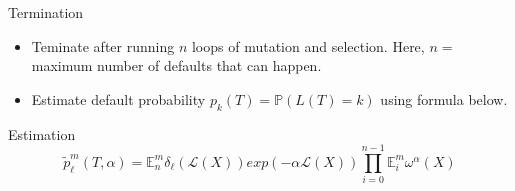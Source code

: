 \begin{frame}{Termination}
	\begin{itemize}
		\item Teminate after running $n$ loops of mutation and selection. Here, $n =$ maximum number of defaults that can happen.
		\item Estimate default probability $p_k(T) = \mathbb{P}\left( L\left( T \right) = k
		      \right)$ using formula below.
	\end{itemize}
	\begin{block}{Estimation}
		\begin{equation*}
	\tilde{p}^m_{\ell}(T,\alpha) = \mathbb{E}^{m}_{n}{\delta_{\ell}(\mathcal{L}(X))exp(-\alpha \mathcal{L}(X))}\prod_{i=0}^{n-1}\mathbb{E}_{i}^{m}\omega^{\alpha}(X)
				\end{equation*}
			\end{block}
		\end{frame}
